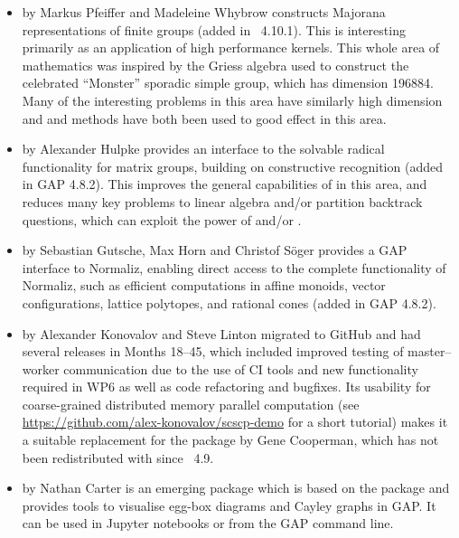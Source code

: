 \begin{itemize}
\item
{} by Markus Pfeiffer and Madeleine Whybrow \cite{MajoranaAlgebras}
constructs Majorana representations of finite groups (added in
\GAP~4.10.1). This is interesting primarily as an application of high
performance kernels. This whole area of mathematics was inspired by
the Griess algebra used to construct the celebrated ``Monster''
sporadic simple group, which has dimension 196884. Many of the
interesting problems in this area have similarly high dimension and
\HPCGAP and  methods have both been used to good effect in
this area.
%
%

\item
{}  by Alexander Hulpke \cite{matgrp} provides an interface
to the solvable radical functionality for matrix groups, building on
constructive recognition (added in GAP 4.8.2). This improves the
general capabilities of \GAP in this area, and reduces many key
problems to linear algebra and/or partition backtrack questions, which
can exploit the power of  and/or .

\item
{} by Sebastian Gutsche, Max Horn and
Christof S\"oger \cite{NormalizInterface} provides a GAP interface to Normaliz, enabling
direct access to the complete functionality of Normaliz, such as efficient
computations in affine monoids, vector configurations, lattice
polytopes, and rational cones (added in GAP 4.8.2). 

\item
{} by Alexander Konovalov and Steve Linton \cite{SCSCP}
migrated to GitHub and had several releases
in Months 18--45, which included improved testing of 
master--worker communication due to the use of
CI tools and new functionality required in WP6 as well as
code refactoring and bugfixes. Its usability for 
coarse-grained distributed memory parallel computation
(see \url{https://github.com/alex-konovalov/scscp-demo}
for a short tutorial) makes it a suitable replacement for the 
package by Gene Cooperman, which has not been redistributed 
with \GAP since \GAP~4.9.

\item
{} by Nathan Carter \cite{SemigroupViz} is an emerging
package which is based on the  package \cite{JupyterViz}
and provides tools to visualise egg-box diagrams and Cayley graphs in
GAP. It can be used in Jupyter notebooks or from the GAP command line.
%
%


\end{itemize}
